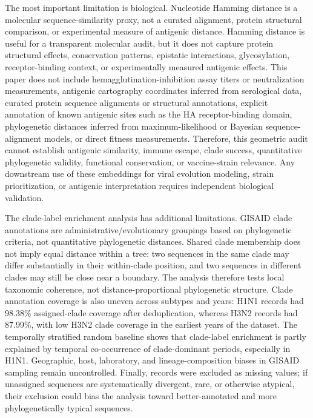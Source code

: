 \documentclass[11pt]{article}
\begin{document}
The most important limitation is biological. Nucleotide Hamming distance is a molecular sequence-similarity proxy, not a curated alignment, protein structural comparison, or experimental measure of antigenic distance. Hamming distance is useful for a transparent molecular audit, but it does not capture protein structural effects, conservation patterns, epistatic interactions, glycosylation, receptor-binding context, or experimentally measured antigenic effects. This paper does not include hemagglutination-inhibition assay titers or neutralization measurements, antigenic cartography coordinates inferred from serological data, curated protein sequence alignments or structural annotations, explicit annotation of known antigenic sites such as the HA receptor-binding domain, phylogenetic distances inferred from maximum-likelihood or Bayesian sequence-alignment models, or direct fitness measurements. Therefore, this geometric audit cannot establish antigenic similarity, immune escape, clade success, quantitative phylogenetic validity, functional conservation, or vaccine-strain relevance. Any downstream use of these embeddings for viral evolution modeling, strain prioritization, or antigenic interpretation requires independent biological validation.

The clade-label enrichment analysis has additional limitations. GISAID clade annotations are administrative/evolutionary groupings based on phylogenetic criteria, not quantitative phylogenetic distances. Shared clade membership does not imply equal distance within a tree: two sequences in the same clade may differ substantially in their within-clade position, and two sequences in different clades may still be close near a boundary. The analysis therefore tests local taxonomic coherence, not distance-proportional phylogenetic structure. Clade annotation coverage is also uneven across subtypes and years: H1N1 records had 98.38\% assigned-clade coverage after deduplication, whereas H3N2 records had 87.99\%, with low H3N2 clade coverage in the earliest years of the dataset. The temporally stratified random baseline shows that clade-label enrichment is partly explained by temporal co-occurrence of clade-dominant periods, especially in H1N1. Geographic, host, laboratory, and lineage-composition biases in GISAID sampling remain uncontrolled. Finally,  records were excluded as missing values; if unassigned sequences are systematically divergent, rare, or otherwise atypical, their exclusion could bias the analysis toward better-annotated and more phylogenetically typical sequences.
\end{document}
